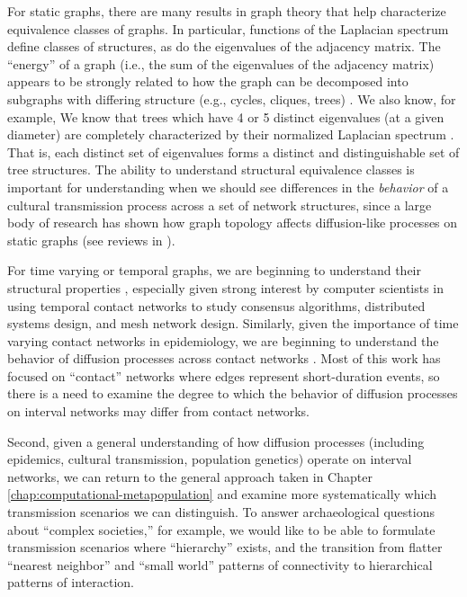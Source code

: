 For static graphs, there are many results in graph theory that help characterize equivalence classes of graphs.  In particular, functions of the Laplacian spectrum define classes of structures, as do the eigenvalues of the adjacency matrix.  The ``energy'' of a graph (i.e., the sum of the eigenvalues of the adjacency matrix) appears to be strongly related to how the graph can be decomposed into subgraphs with differing structure (e.g., cycles, cliques, trees) \citep{estrada2017meaning,gutman2006laplacian}.  We also know, for example, We know that trees which have 4 or 5 distinct eigenvalues (at a given diameter) are completely characterized by their normalized Laplacian spectrum \citep{braga2015trees}.  That is, each distinct set of eigenvalues forms a distinct and distinguishable set of tree structures.  The ability to understand structural equivalence classes is important for understanding when we should see differences in the \emph{behavior} of a cultural transmission process across a set of network structures, since a large body of research has shown how graph topology affects diffusion-like processes on static graphs (see reviews in  \citealt{Castellano2006,Durrett2007,grimmett2018probability,szabo2007evolutionary}).

For time varying or temporal graphs, we are beginning to understand their structural properties \citep{nicosia2013graph,nicosia2012components}, especially given strong interest by computer scientists in using temporal contact networks to study consensus algorithms, distributed systems design, and mesh network design.  Similarly, given the importance of time varying contact networks in epidemiology, we are beginning to understand the behavior of diffusion processes across contact networks \citep{liu2013contagion,pare2017epidemic,liu2014social,uribe2019non,santoro2011time}.  Most of this work has focused on ``contact'' networks where edges represent short-duration events, so there is a need to examine the degree to which the behavior of diffusion processes on interval networks may differ from contact networks.  

Second, given a general understanding of how diffusion processes (including epidemics, cultural transmission, population genetics) operate on interval networks, we can return to the general approach taken in Chapter \ref{chap:computational-metapopulation} and examine more systematically which transmission scenarios we can distinguish.  To answer archaeological questions about ``complex societies,'' for example, we would like to be able to formulate transmission scenarios where ``hierarchy'' exists, and the transition from flatter ``nearest neighbor'' and ``small world'' patterns of connectivity to hierarchical patterns of interaction.  

